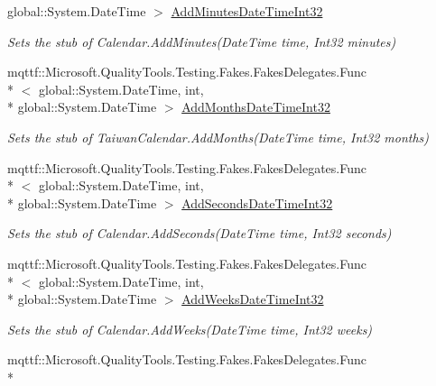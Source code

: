 \begin{DoxyCompactItemize}
global\-::\-System.\-Date\-Time $>$ \hyperlink{class_system_1_1_globalization_1_1_fakes_1_1_stub_taiwan_calendar_a920f4dd62a95f822d64b25ce57522d76}{Add\-Minutes\-Date\-Time\-Int32}
\begin{DoxyCompactList}\small\item\em Sets the stub of Calendar.\-Add\-Minutes(\-Date\-Time time, Int32 minutes)\end{DoxyCompactList}\item 
mqttf\-::\-Microsoft.\-Quality\-Tools.\-Testing.\-Fakes.\-Fakes\-Delegates.\-Func\\*
$<$ global\-::\-System.\-Date\-Time, int, \\*
global\-::\-System.\-Date\-Time $>$ \hyperlink{class_system_1_1_globalization_1_1_fakes_1_1_stub_taiwan_calendar_a40d3900b349f238013ae0be5c115b935}{Add\-Months\-Date\-Time\-Int32}
\begin{DoxyCompactList}\small\item\em Sets the stub of Taiwan\-Calendar.\-Add\-Months(\-Date\-Time time, Int32 months)\end{DoxyCompactList}\item 
mqttf\-::\-Microsoft.\-Quality\-Tools.\-Testing.\-Fakes.\-Fakes\-Delegates.\-Func\\*
$<$ global\-::\-System.\-Date\-Time, int, \\*
global\-::\-System.\-Date\-Time $>$ \hyperlink{class_system_1_1_globalization_1_1_fakes_1_1_stub_taiwan_calendar_a156074c458e66b884cca990892c79814}{Add\-Seconds\-Date\-Time\-Int32}
\begin{DoxyCompactList}\small\item\em Sets the stub of Calendar.\-Add\-Seconds(\-Date\-Time time, Int32 seconds)\end{DoxyCompactList}\item 
mqttf\-::\-Microsoft.\-Quality\-Tools.\-Testing.\-Fakes.\-Fakes\-Delegates.\-Func\\*
$<$ global\-::\-System.\-Date\-Time, int, \\*
global\-::\-System.\-Date\-Time $>$ \hyperlink{class_system_1_1_globalization_1_1_fakes_1_1_stub_taiwan_calendar_a03a792d7bc48b05b7c6914d48359085f}{Add\-Weeks\-Date\-Time\-Int32}
\begin{DoxyCompactList}\small\item\em Sets the stub of Calendar.\-Add\-Weeks(\-Date\-Time time, Int32 weeks)\end{DoxyCompactList}\item 
mqttf\-::\-Microsoft.\-Quality\-Tools.\-Testing.\-Fakes.\-Fakes\-Delegates.\-Func\\*

\end{DoxyCompactItemize}
